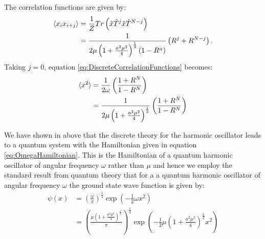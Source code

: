 \documentclass[12pt]{article}
\begin{document}
        The correlation functions are given by:
        \begin{align}
            \label{eq:DiscreteCorrelationFunctions}
            \braket{x_ix_{i+j}} & = \frac{1}{Z}Tr\left(\hat{x}\hat{T}^j\hat{x}\hat{T}^{N-j}\right) \\
                                & = \frac{1}{2\mu\left(1+\frac{a^2\mu^2}{4}\right)^\frac{1}{2}\left(1-R^{n}\right)}\left(R^{j}+R^{N-j}\right).
        \end{align}
        Taking $j=0$, equation \ref{eq:DiscreteCorrelationFunctions} becomes:
        \begin{align}
            \label{eq:XSquaredExpectation2} \braket{x^2} & = \frac{1}{2\omega}\left(\frac{1+R^N}{1-R^N}\right) \\
            \label{eq:XSquaredExpectation23} & = \frac{1}{2\mu\left(1+\frac{a^2\mu^2}{4}\right)^{\frac{1}{2}}}\left(\frac{1+R^N}{1-R^N}\right)
        \end{align}

        We have shown in above that the discrete theory for the harmonic oscillator leads to a quantum system with the Hamiltonian given in equation \ref{eq:OmegaHamiltonian}. This is the Hamiltonian of a quantum harmonic oscillator of angular frequency $\omega$ rather than $\mu$ and hence we employ the standard result from quantum theory that for a a quantum harmonic oscillator of angular frequency $\omega$ the ground state wave function is given by:
        \begin{align}
            \label{eq:DiscreteGroundStateWaveFunction2}
            \psi(x) & = \left(\frac{\omega}{\pi}\right)^\frac{1}{4}\exp\left(-\frac{1}{2}\omega x^2\right) \\
                    & = \left(\frac{\mu\left(1+\frac{a^2\mu^2}{4}\right)^\frac{1}{2}}{\pi}\right)^\frac{1}{4}\exp\left(-\frac{1}{2}\mu\left(1+\frac{a^2\mu^2}{4}\right)^\frac{1}{2} x^2\right)
        \end{align}
\end{document}
